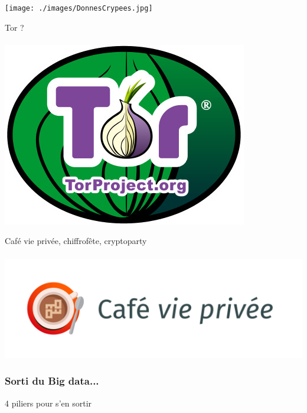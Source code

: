 \documentclass{beamer}
\begin{document}
\begin{frame}
\texttt{[image: ./images/DonnesCrypees.jpg]}
\end{frame}
\begin{frame}
\begin{center}
\Huge{Tor ? }
\\~\\ \includegraphics[scale=0.4]{./images/logo_tor.jpg}
\end{center}
\end{frame}

\begin{frame}
\begin{center}
\Huge{Café vie privée, chiffrofête, cryptoparty}
\\~\\
\includegraphics[scale=0.3] {./images/LogoCafeViePrivee.jpg}
\end{center}
\end{frame}

\begin{frame}
\frametitle{Sorti du Big data...}
\begin{block}{4 piliers pour s'en sortir}
\begin{itemize}
\end{itemize}
\end{block}
\end{frame}
\end{document}
